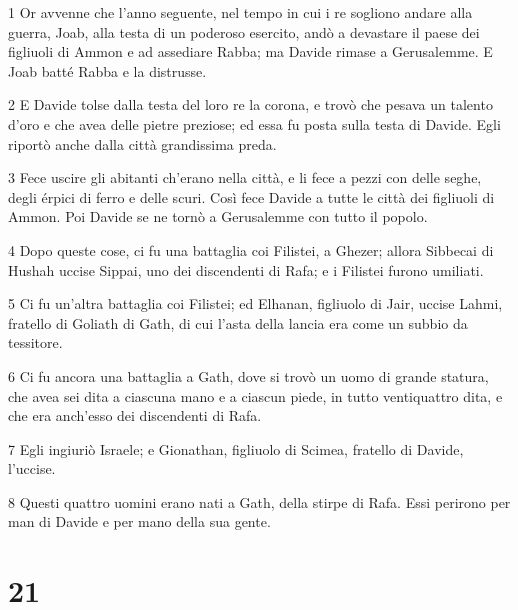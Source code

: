 \par 1 Or avvenne che l'anno seguente, nel tempo in cui i re sogliono andare alla guerra, Joab, alla testa di un poderoso esercito, andò a devastare il paese dei figliuoli di Ammon e ad assediare Rabba; ma Davide rimase a Gerusalemme. E Joab batté Rabba e la distrusse.
\par 2 E Davide tolse dalla testa del loro re la corona, e trovò che pesava un talento d'oro e che avea delle pietre preziose; ed essa fu posta sulla testa di Davide. Egli riportò anche dalla città grandissima preda.
\par 3 Fece uscire gli abitanti ch'erano nella città, e li fece a pezzi con delle seghe, degli érpici di ferro e delle scuri. Così fece Davide a tutte le città dei figliuoli di Ammon. Poi Davide se ne tornò a Gerusalemme con tutto il popolo.
\par 4 Dopo queste cose, ci fu una battaglia coi Filistei, a Ghezer; allora Sibbecai di Hushah uccise Sippai, uno dei discendenti di Rafa; e i Filistei furono umiliati.
\par 5 Ci fu un'altra battaglia coi Filistei; ed Elhanan, figliuolo di Jair, uccise Lahmi, fratello di Goliath di Gath, di cui l'asta della lancia era come un subbio da tessitore.
\par 6 Ci fu ancora una battaglia a Gath, dove si trovò un uomo di grande statura, che avea sei dita a ciascuna mano e a ciascun piede, in tutto ventiquattro dita, e che era anch'esso dei discendenti di Rafa.
\par 7 Egli ingiuriò Israele; e Gionathan, figliuolo di Scimea, fratello di Davide, l'uccise.
\par 8 Questi quattro uomini erano nati a Gath, della stirpe di Rafa. Essi perirono per man di Davide e per mano della sua gente.

\chapter{21}

